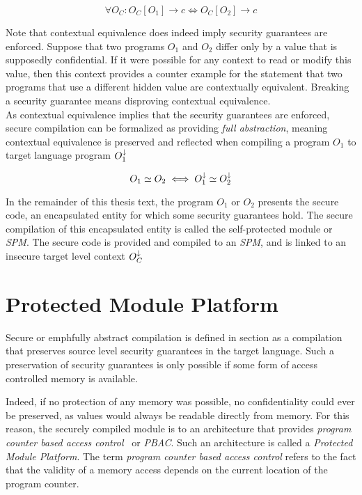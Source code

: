 \[
    \forall O_C : O_C[O_{1}] \rightarrow c \iff O_C[O_{2}] \rightarrow c
\]

Note that contextual equivalence does indeed imply security guarantees are enforced.
Suppose that two programs $O_1$ and $O_2$ differ only by a value that is supposedly confidential.
If it were possible for any context to read or modify this value, then this context provides a counter example for the statement that two programs that use a different hidden value are contextually equivalent.
Breaking a security guarantee means disproving contextual equivalence.
\\[1em]
As contextual equivalence implies that the security guarantees are enforced, secure compilation can be formalized as providing \emph{full abstraction}, meaning contextual equivalence is preserved and reflected when compiling a program $O_1$ to target language program $O_1^{\downarrow}$

\[
    O_{1} \simeq O_{2} \iff O_{1}^{\downarrow} \simeq O_{2}^{\downarrow}
\]

In the remainder of this thesis text, the program $O_1$ or $O_2$ presents the secure code, an encapsulated entity for which some security guarantees hold.
The secure compilation of this encapsulated entity is called the self-protected module or \emph{SPM}.
The secure code is provided and compiled to an \emph{SPM}, and is linked to an insecure target level context $O_C^{\downarrow}$

\section{Protected Module Platform}
\label{sec:protectedmoduleplatform}
Secure or emph{fully abstract} compilation is defined in section  as a compilation that preserves source level security guarantees in the target language.
Such a preservation of security guarantees is only possible if some form of access controlled memory is available.

Indeed, if no protection of any memory was possible, no confidentiality could ever be preserved, as values would always be readable directly from memory.
For this reason, the securely compiled module is to an architecture that provides \emph{program counter based access control}~\cite{PCBAC} or \emph{PBAC}.
Such an architecture is called a \emph{Protected Module Platform}. 
The term \emph{program counter based access control} refers to the fact that the validity of a memory access depends on the current location of the program counter.

